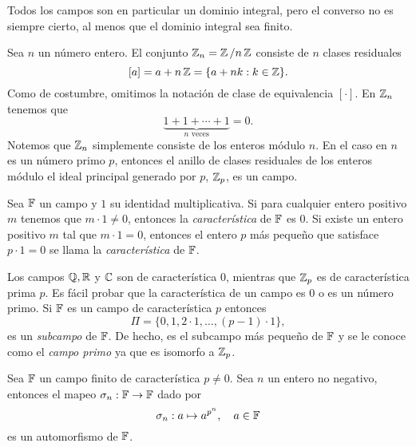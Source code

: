 Todos los campos son en particular un dominio integral, pero
el converso no es siempre cierto, al menos que el dominio
integral sea finito.
\begin{example}
  Sea $n$ un número entero. El conjunto $\operatorname{\mathbb{Z}}_n = \operatorname{\mathbb{Z}} / n\operatorname{\mathbb{Z}}$
  consiste de $n$ clases residuales
  \[
    [a] = a + n\operatorname{\mathbb{Z}} = \{a + nk : k \in \operatorname{\mathbb{Z}}\}.
  \] 
  Como de costumbre, omitimos la notación de clase de
  equivalencia $[\cdot]$. En $\operatorname{\mathbb{Z}}_n$ tenemos que
  \[
    \underbrace{1 + 1 + \cdots + 1}_{n \text{ veces}} 
    = 0.
  \] 
  Notemos que $\operatorname{\mathbb{Z}}_n$ simplemente consiste de los enteros
  módulo $n$. En el caso en $n$ es un número primo $p$,
  entonces el anillo de clases residuales de los enteros
  módulo el ideal principal generado por $p$, $\operatorname{\mathbb{Z}}_p$, es un
  campo.
\end{example}
\begin{definition}
  Sea $\operatorname{\mathbb{F}}$ un campo y $1$ su identidad multiplicativa. Si
  para cualquier entero positivo $m$ tenemos que $m \cdot 1
  \neq 0$, entonces la \textit{característica} de  $\operatorname{\mathbb{F}}$ es
  0. Si existe un entero positivo $m$ tal que $m \cdot 1 =
  0$, entonces el entero $p$ más pequeño que satisface $p
  \cdot 1 = 0$ se llama la \textit{característica} de $\operatorname{\mathbb{F}}$.
\end{definition}
Los campos $\operatorname{\mathbb{Q}}, \operatorname{\mathbb{R}}$ y $\operatorname{\mathbb{C}}$ son de característica 0, mientras
que $\operatorname{\mathbb{Z}}_p$ es de característica prima $p$. Es fácil probar
que la característica de un campo es 0 o es un número primo.
Si $\operatorname{\mathbb{F}}$ es un campo de característica $p$ entonces
\[
  \Pi = \{0, 1, 2 \cdot 1,\ldots,(p-1) \cdot 1\},
\] 
es un \textit{subcampo} de $\operatorname{\mathbb{F}}$. De hecho, es el subcampo
más pequeño de $\operatorname{\mathbb{F}}$ y se le conoce como el \textit{campo
primo} ya que es isomorfo a $\operatorname{\mathbb{Z}}_p$.
\begin{lemma}
  Sea $\operatorname{\mathbb{F}}$ un campo finito de característica $p \neq 0$. Sea
  $n$ un entero no negativo, entonces el mapeo $\sigma_n :
  \operatorname{\mathbb{F}} \to \operatorname{\mathbb{F}}$ dado por
  \[
    \sigma_n : a \mapsto a^{p^{n}},
    \quad a \in \operatorname{\mathbb{F}}
  \] 
  es un automorfismo de $\operatorname{\mathbb{F}}$.
\end{lemma}

